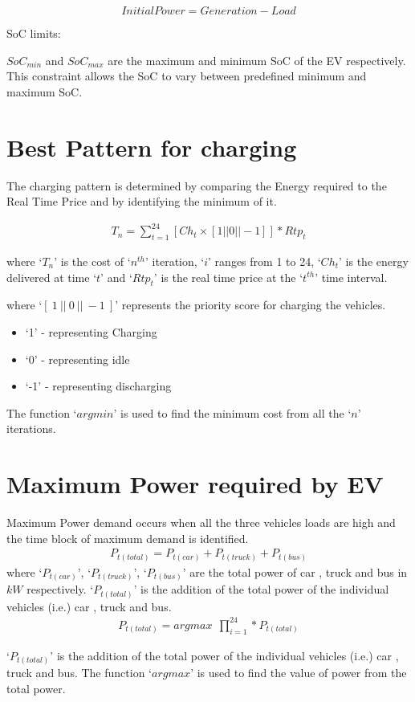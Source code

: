 \begin{equation}             
	 Initial Power = Generation - Load
\end{equation}

	  SoC limits:  
	 
	   $SoC_{min}$ and $SoC_{max}$ are  the maximum and minimum SoC of the EV respectively.
	   This constraint allows the SoC to vary between predefined minimum and maximum SoC.               
	
	\section{Best Pattern for charging}
	
	
	The charging pattern is determined by comparing the Energy required to the Real Time Price and by  identifying the minimum of it. 
	
	\begin{equation}
		\begin{split}
				T_{n} = \sum_{t=1}^{24} [Ch_{t} \times [1 || 0 || -1 ] ] \ast  Rtp_{t} 
		\end{split}
    \end{equation}	 

where `$T_{n}$' is the cost of `$n^{th}$' iteration, `$i$' ranges from 1 to 24, `$Ch_{t}$' is the energy delivered at time `$t$' and `$Rtp_{t}$' is the real time price at the `$t^{th}$' time interval.

\noindent where `$[ \ 1 \ ||\ 0 \ ||\ -1\ ]$' represents the priority score for charging the vehicles.

	\begin{itemize}
		\item `1' - representing Charging
		\item `0' - representing idle
		\item `-1' - representing discharging
	\end{itemize}


The function `$argmin$'  is used to find the minimum cost from all the `$n$' iterations.	

	\section{Maximum Power required by EV}
	
	
	Maximum Power demand occurs when all the three vehicles loads are high and the time block of maximum demand is identified. 
	\begin{equation}
		\begin{split}
					P_{t(total)} = P_{t(car)} + P_{t(truck)} + P_{t(bus)}
		\end{split}
	\end{equation}	
where `$P_{t(car)}$', `$P_{t(truck)}$', `$P_{t(bus)}$' are the total power of car , truck and bus in $kW$ respectively. `$P_{t(total)}$' is the addition of the total  power of the individual vehicles (i.e.) car , truck and bus.
	\begin{equation}
		\begin{split}
				P_{t(total)} = argmax ~~\prod_{i=1}^{24} \ast P_{t(total)}
		\end{split}
	\end{equation}

`$P_{t(total)}$' is the addition of the total  power of the individual vehicles (i.e.) car , truck and bus. 
The function `$argmax$' is used to find the value of power from the total power. 
	
